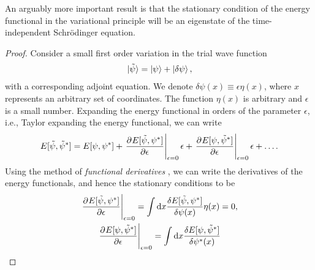         An arguably more important result is that the stationary condition of
        the energy functional in the variational principle will be an eigenstate
        of the time-independent Schrödinger equation.
        \begin{proof}
            Consider a small first order variation in the trial wave function
            \begin{align}
                \ket*{\tilde{\psi}} = \ket{\psi} + \ket{\delta\psi},
                \label{eq:wave-variation}
            \end{align}
            with a corresponding adjoint equation.
            We denote $\delta\psi(x) \equiv \epsilon\eta(x)$, where $x$ represents an
            arbitrary set of coordinates.
            The function $\eta(x)$ is arbitrary and $\epsilon$ is a small
            number.
            Expanding the energy functional in orders of the parameter
            $\epsilon$, i.e., Taylor expanding the energy functional, we can
            write
            \begin{align}
                E[\tilde{\psi}, \tilde{\psi}^{*}]
                = E[\psi, \psi^{*}]
                + \left.
                \dpd{E[\tilde{\psi}, \psi^{*}]}{\epsilon}
                \right\rvert_{\epsilon = 0}
                \epsilon
                + \left.
                \dpd{E[\psi, \tilde{\psi}^{*}]}{\epsilon}
                \right\rvert_{\epsilon = 0}
                \epsilon
                + \dots.
            \end{align}
            Using the method of \emph{functional derivatives}
            \cite{wiki:functional-derivative, kvaal2017notes}, we can write
            the derivatives of the energy functionals, and hence the stationary
            conditions to be
            \begin{gather}
                \left.
                \dpd{E[\tilde{\psi}, \psi^{*}]}{\epsilon}
                \right\rvert_{\epsilon = 0}
                =
                \int\dd x \frac{
                    \delta E[\tilde{\psi}, \psi^{*}]
                }{
                    \delta \psi(x)
                }
                \eta(x)
                = 0,
                \\
                \left.
                \dpd{E[\psi, \tilde{\psi}^{*}]}{\epsilon}
                \right\rvert_{\epsilon = 0}
                =
                \int\dd x \frac{
                    \delta E[\psi, \tilde{\psi}^{*}]
                }{
                    \delta
                    \psi^{*}(x)
}
\end{gather}
\end{proof}
